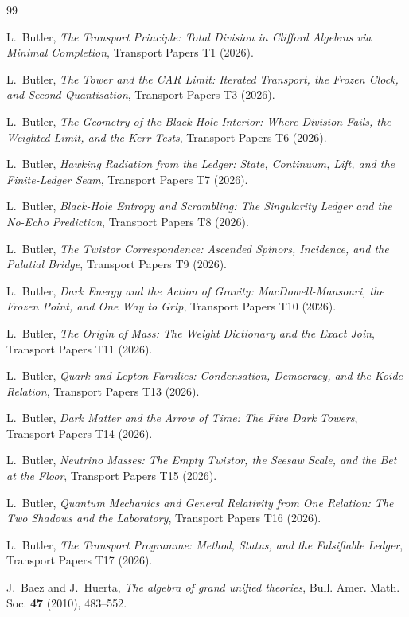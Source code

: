 \documentclass[11pt]{article}
\theoremstyle{definition}
\begin{document}
\begin{thebibliography}{99}

L.~Butler,
\emph{The Transport Principle: Total Division in Clifford Algebras via Minimal Completion},
Transport Papers T1 (2026).

L.~Butler,
\emph{The Tower and the CAR Limit: Iterated Transport, the Frozen Clock, and Second Quantisation},
Transport Papers T3 (2026).

L.~Butler,
\emph{The Geometry of the Black-Hole Interior: Where Division Fails, the Weighted Limit, and the Kerr Tests},
Transport Papers T6 (2026).

L.~Butler,
\emph{Hawking Radiation from the Ledger: State, Continuum, Lift, and the Finite-Ledger Seam},
Transport Papers T7 (2026).

L.~Butler,
\emph{Black-Hole Entropy and Scrambling: The Singularity Ledger and the No-Echo Prediction},
Transport Papers T8 (2026).

L.~Butler,
\emph{The Twistor Correspondence: Ascended Spinors, Incidence, and the Palatial Bridge},
Transport Papers T9 (2026).

L.~Butler,
\emph{Dark Energy and the Action of Gravity: MacDowell-Mansouri, the Frozen Point, and One Way to Grip},
Transport Papers T10 (2026).

L.~Butler,
\emph{The Origin of Mass: The Weight Dictionary and the Exact Join},
Transport Papers T11 (2026).

L.~Butler,
\emph{Quark and Lepton Families: Condensation, Democracy, and the Koide Relation},
Transport Papers T13 (2026).

L.~Butler,
\emph{Dark Matter and the Arrow of Time: The Five Dark Towers},
Transport Papers T14 (2026).

L.~Butler,
\emph{Neutrino Masses: The Empty Twistor, the Seesaw Scale, and the Bet at the Floor},
Transport Papers T15 (2026).

L.~Butler,
\emph{Quantum Mechanics and General Relativity from One Relation: The Two Shadows and the Laboratory},
Transport Papers T16 (2026).

L.~Butler,
\emph{The Transport Programme: Method, Status, and the Falsifiable Ledger},
Transport Papers T17 (2026).

J.~Baez and J.~Huerta,
\emph{The algebra of grand unified theories},
Bull. Amer. Math. Soc. \textbf{47} (2010), 483--552.


\end{thebibliography}
\end{document}
